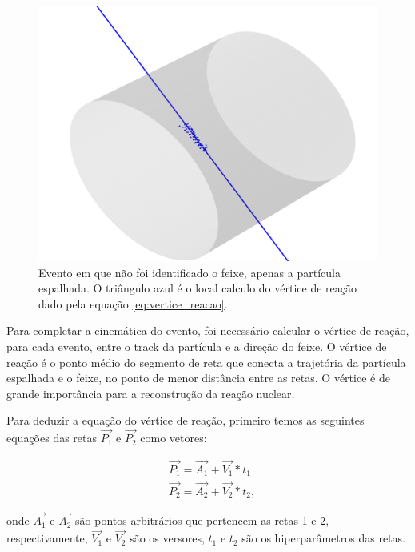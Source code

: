 \documentclass[a4paper,12pt,oneside]{book}
\begin{document}
\begin{figure}[H]
    \centering
    \includegraphics[scale = 0.65]{figs/Figure_12.png}
    \caption{Evento em que não foi identificado o feixe, apenas a partícula espalhada. O triângulo azul é o local calculo do vértice de reação dado pela equação \ref{eq:vertice_reacao}.}
    \label{fig:exemplo_sem_feixe}
\end{figure}

\par Para completar a cinemática do evento, foi necessário calcular o vértice de reação, para cada evento, entre o track da partícula e a direção do feixe. O vértice de reação é o ponto médio do segmento de reta que conecta a trajetória da partícula espalhada e o feixe, no ponto de menor distância entre as retas. O vértice é de grande importância para a reconstrução da reação nuclear.

\par Para deduzir a equação do vértice de reação, primeiro temos as seguintes equações das retas $\vec{P_1}$ e $\vec{P_2}$ como vetores:

\begin{equation}
\begin{split}
        &\vec{P_1} = \vec{A_1} + \vec{V_1} * t_1 \\
        &\vec{P_2} = \vec{A_2} + \vec{V_2} * t_2,
\end{split}
\end{equation}

onde $\vec{A_1}$ e $\vec{A_2}$ são pontos arbitrários que pertencem as retas 1 e 2, respectivamente, $\vec{V_1}$ e $\vec{V_2}$ são os versores, $t_1$ e  $t_2$ são os hiperparâmetros das retas.
\end{document}
